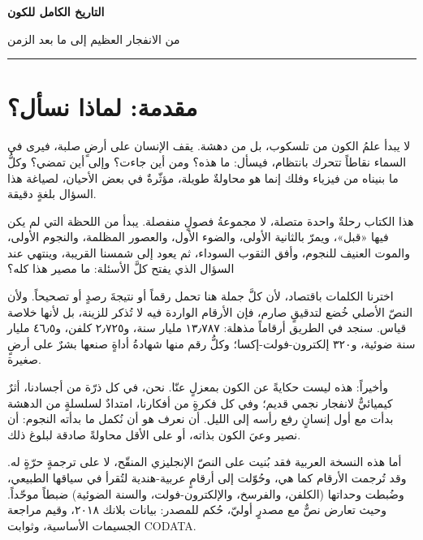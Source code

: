 \documentclass[12pt,a4paper,openany]{book}
\begin{document}
\begin{titlepage}
\centering
\vspace*{2cm}
{\Huge\bfseries التاريخ الكامل للكون\par}
\vspace{0.9cm}
{\Large من الانفجار العظيم إلى ما بعد الزمن\par}
\vspace{0.6cm}
\rule{8cm}{0.6pt}\par
\vspace{0.9cm}
\end{titlepage}

\tableofcontents
\clearpage

\chapter*{مقدمة: لماذا نسأل؟}

لا يبدأ علمُ الكون من تلسكوب، بل من دهشة. يقف الإنسان على أرضٍ صلبة، فيرى في السماء نقاطاً تتحرك بانتظام، فيسأل: ما هذه؟ ومن أين جاءت؟ وإلى أين تمضي؟ وكلُّ ما بنيناه من فيزياء وفلك إنما هو محاولةٌ طويلة، مؤثّرةٌ في بعض الأحيان، لصياغة هذا السؤال بلغةٍ دقيقة.


هذا الكتاب رحلةٌ واحدة متصلة، لا مجموعةُ فصولٍ منفصلة. يبدأ من اللحظة التي لم يكن فيها «قبل»، ويمرّ بالثانية الأولى، والضوء الأول، والعصور المظلمة، والنجوم الأولى، والموت العنيف للنجوم، وأفق الثقوب السوداء، ثم يعود إلى شمسنا القريبة، وينتهي عند السؤال الذي يفتح كلَّ الأسئلة: ما مصير هذا كله؟


اخترنا الكلمات باقتصاد، لأن كلَّ جملة هنا تحمل رقماً أو نتيجةَ رصدٍ أو تصحيحاً. ولأن النصّ الأصلي خُضع لتدقيقٍ صارم، فإن الأرقام الواردة فيه لا تُذكر للزينة، بل لأنها خلاصة قياس. سنجد في الطريق أرقاماً مذهلة: ١٣٫٧٨٧ مليار سنة، و٢٫٧٢٥ كلفن، و٤٦٫٥ مليار سنة ضوئية، و٣٢٠ إلكترون-فولت-إكسا؛ وكلُّ رقم منها شهادةُ أداةٍ صنعها بشرٌ على أرضٍ صغيرة.


وأخيراً: هذه ليست حكايةً عن الكون بمعزلٍ عنّا. نحن، في كل ذرّة من أجسادنا، أثرٌ كيميائيٌّ لانفجار نجمي قديم؛ وفي كل فكرةٍ من أفكارنا، امتدادٌ لسلسلةٍ من الدهشة بدأت مع أول إنسانٍ رفع رأسه إلى الليل. أن نعرف هو أن نُكمل ما بدأته النجوم: أن نصير وعيَ الكون بذاته، أو على الأقل محاولةً صادقة لبلوغ ذلك.


أما هذه النسخة العربية فقد بُنيت على النصّ الإنجليزي المنقّح، لا على ترجمةٍ حرّةٍ له. وقد تُرجمت الأرقام كما هي، وحُوّلت إلى أرقامٍ عربية-هندية لتُقرأ في سياقها الطبيعي، وضُبطت وحداتها (الكلفن، والفرسخ، والإلكترون-فولت، والسنة الضوئية) ضبطاً موحّداً. وحيث تعارض نصٌّ مع مصدرٍ أوليّ، حُكم للمصدر: بيانات بلانك ٢٠١٨، وقيم مراجعة الجسيمات الأساسية، وثوابت CODATA.
\end{document}
